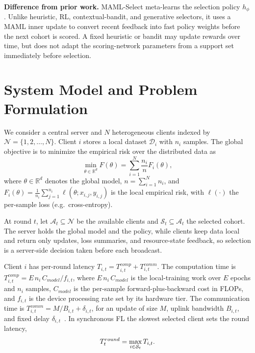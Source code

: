 \documentclass[journal]{IEEEtran}
\theoremstyle{remark}
\newcommand{\revision}[1]{#1}
\begin{document}
\revision{\textbf{Difference from prior work.} MAML-Select meta-learns the selection policy $h_\phi$. Unlike heuristic, RL, contextual-bandit, and generative selectors, it uses a MAML inner update to convert recent feedback into fast policy weights before the next cohort is scored. A fixed heuristic or bandit may update rewards over time, but does not adapt the scoring-network parameters from a support set immediately before selection.}

\section{System Model and Problem Formulation}
\revision{We consider a central server and $N$ heterogeneous clients indexed by $\mathcal{N} = \{1, 2, \ldots, N\}$. Client $i$ stores a local dataset $\mathcal{D}_i$ with $n_i$ samples.} The global objective is to minimize the empirical risk over the distributed data as
\begin{equation}
	\min_{\theta \in \mathbb{R}^d} F(\theta) = \sum_{i=1}^{N} \frac{n_i}{n} F_i(\theta),
	\label{eq:global_objective}
\end{equation}
\revision{where $\theta \in \mathbb{R}^d$ denotes the global model, $n = \sum_{i=1}^{N} n_i$, and $F_i(\theta) = \frac{1}{n_i} \sum_{j=1}^{n_i} \ell(\theta; x_{i,j}, y_{i,j})$ is the local empirical risk, with $\ell(\cdot)$ the per-sample loss (e.g.\ cross-entropy).}

\revision{At round $t$, let $\mathcal{A}_t \subseteq \mathcal{N}$ be the available clients and $\mathcal{S}_t \subseteq \mathcal{A}_t$ the selected cohort. The server holds the global model and the policy, while clients keep data local and return only updates, loss summaries, and resource-state feedback, so selection is a server-side decision taken before each broadcast.}

\revision{Client $i$ has per-round latency $T_{i,t}=T_{i,t}^{comp}+T_{i,t}^{comm}$. The computation time is $T_{i,t}^{comp} = E\, n_i\, C_{model}/f_{i,t}$, where $E\, n_i\, C_{model}$ is the local-training work over $E$ epochs and $n_i$ samples, $C_{model}$ is the per-sample forward-plus-backward cost in FLOPs, and $f_{i,t}$ is the device processing rate set by its hardware tier. The communication time is $T_{i,t}^{comm} = M/B_{i,t} + \delta_{i,t}$, for an update of size $M$, uplink bandwidth $B_{i,t}$, and fixed delay $\delta_{i,t}$~\cite{nishio2019client}. In synchronous FL the slowest selected client sets the round latency,}
\begin{equation}
	\color{black}
	T_t^{round} = \max_{i \in \mathcal{S}_t} T_{i,t}.
	\label{eq:round_latency}
\end{equation}
\end{document}
